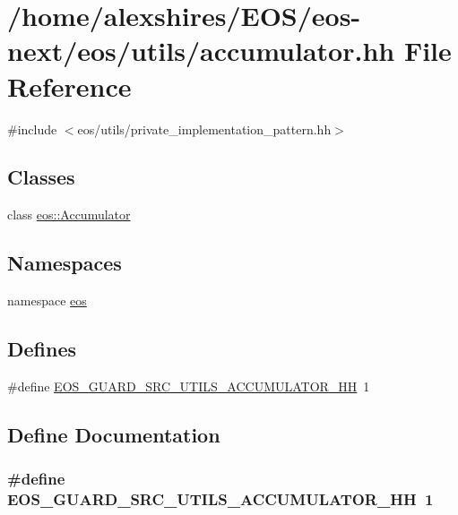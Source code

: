 \hypertarget{accumulator_8hh}{
\section{/home/alexshires/EOS/eos-\/next/eos/utils/accumulator.hh File Reference}
\label{accumulator_8hh}
}
{\ttfamily \#include $<$eos/utils/private\_\-implementation\_\-pattern.hh$>$}\par
\subsection*{Classes}
\begin{DoxyCompactItemize}
\item 
class \hyperlink{classeos_1_1Accumulator}{eos::Accumulator}
\end{DoxyCompactItemize}
\subsection*{Namespaces}
\begin{DoxyCompactItemize}
\item 
namespace \hyperlink{namespaceeos}{eos}
\end{DoxyCompactItemize}
\subsection*{Defines}
\begin{DoxyCompactItemize}
\item 
\#define \hyperlink{accumulator_8hh_a67029bc7ee4702ebdf5383678131963e}{EOS\_\-GUARD\_\-SRC\_\-UTILS\_\-ACCUMULATOR\_\-HH}~1
\end{DoxyCompactItemize}


\subsection{Define Documentation}
\hypertarget{accumulator_8hh_a67029bc7ee4702ebdf5383678131963e}{
\subsubsection[{EOS\_\-GUARD\_\-SRC\_\-UTILS\_\-ACCUMULATOR\_\-HH}]{\setlength{\rightskip}{0pt plus 5cm}\#define EOS\_\-GUARD\_\-SRC\_\-UTILS\_\-ACCUMULATOR\_\-HH~1}}
\label{accumulator_8hh_a67029bc7ee4702ebdf5383678131963e}
